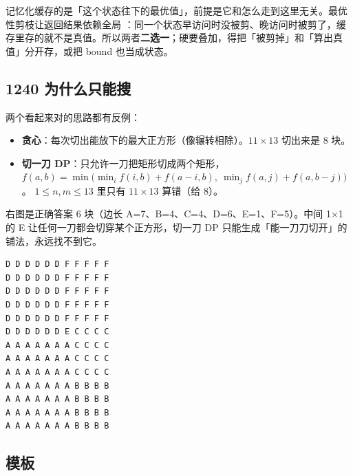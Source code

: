 \begin{principle}
记忆化缓存的是「这个状态往下的最优值」，前提是它和怎么走到这里无关。最优性剪枝让返回结果依赖全局 ：同一个状态早访问时没被剪、晚访问时被剪了，缓存里存的就不是真值。所以两者\textbf{二选一}；硬要叠加，得把「被剪掉」和「算出真值」分开存，或把 bound 也当成状态。
\end{principle}

\subsection{1240 为什么只能搜}

\begin{minipage}[t]{0.56\linewidth}\vspace{0pt}
两个看起来对的思路都有反例：
\begin{itemize}
\item \textbf{贪心}：每次切出能放下的最大正方形（像辗转相除）。$11 \times 13$ 切出来是 8 块。
\item \textbf{切一刀 DP}：只允许一刀把矩形切成两个矩形，
$f(a,b) = \min\big(\min_i f(i,b) + f(a-i,b),\ \min_j f(a,j) + f(a,b-j)\big)$。
$1 \le n, m \le 13$ 里只有 $11 \times 13$ 算错（给 8）。
\end{itemize}
右图是正确答案 6 块（边长 A=7、B=4、C=4、D=6、E=1、F=5）。中间 1×1 的 E 让任何一刀都会切穿某个正方形，切一刀 DP 只能生成「能一刀刀切开」的铺法，永远找不到它。
\end{minipage}\hfill
\begin{minipage}[t]{0.4\linewidth}\vspace{0pt}
\begin{Verbatim}[fontsize=\footnotesize,frame=single,framesep=4pt]
D D D D D D F F F F F
D D D D D D F F F F F
D D D D D D F F F F F
D D D D D D F F F F F
D D D D D D F F F F F
D D D D D D E C C C C
A A A A A A A C C C C
A A A A A A A C C C C
A A A A A A A C C C C
A A A A A A A B B B B
A A A A A A A B B B B
A A A A A A A B B B B
A A A A A A A B B B B
\end{Verbatim}
\end{minipage}

\subsection{模板}

